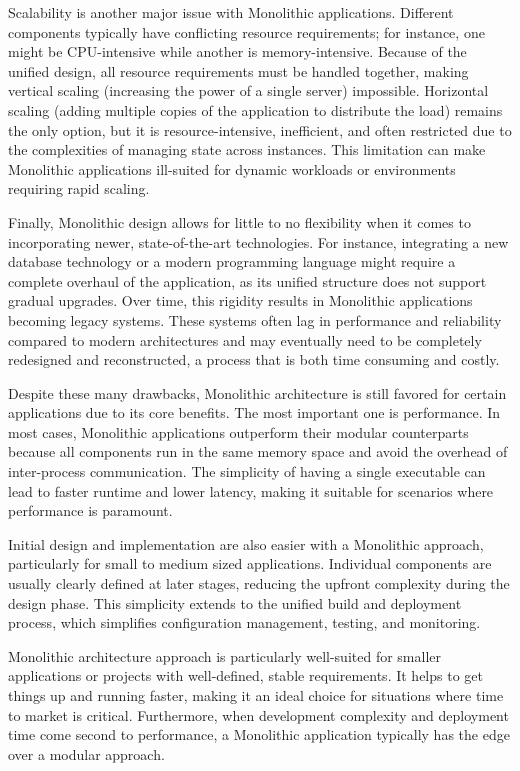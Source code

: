 Scalability is another major issue with Monolithic applications. Different components typically have conflicting resource requirements; for instance, one might be CPU-intensive while another is memory-intensive. Because of the unified design, all resource requirements must be handled together, making vertical scaling (increasing the power of a single server) impossible. Horizontal scaling (adding multiple copies of the application to distribute the load) remains the only option, but it is resource-intensive, inefficient, and often restricted due to the complexities of managing state across instances. This limitation can make Monolithic applications ill-suited for dynamic workloads or environments requiring rapid scaling. 

Finally, Monolithic design allows for little to no flexibility when it comes to incorporating newer, state-of-the-art technologies. For instance, integrating a new database technology or a modern programming language might require a complete overhaul of the application, as its unified structure does not support gradual upgrades. Over time, this rigidity results in Monolithic applications becoming legacy systems. These systems often lag in performance and reliability compared to modern architectures and may eventually need to be completely redesigned and reconstructed, a process that is both time consuming and costly. 

Despite these many drawbacks, Monolithic architecture is still favored for certain applications due to its core benefits. The most important one is performance. In most cases, Monolithic applications outperform their modular counterparts because all components run in the same memory space and avoid the overhead of inter-process communication\cite{whatismono}. The simplicity of having a single executable can lead to faster runtime and lower latency, making it suitable for scenarios where performance is paramount. 

Initial design and implementation are also easier with a Monolithic approach, particularly for small to medium sized applications. Individual components are usually clearly defined at later stages, reducing the upfront complexity during the design phase. This simplicity extends to the unified build and deployment process, which simplifies configuration management, testing, and monitoring. 

Monolithic architecture approach is particularly well-suited for smaller applications or projects with well-defined, stable requirements. It helps to get things up and running faster, making it an ideal choice for situations where time to market is critical. Furthermore, when development complexity and deployment time come second to performance, a Monolithic application typically has the edge over a modular approach.

